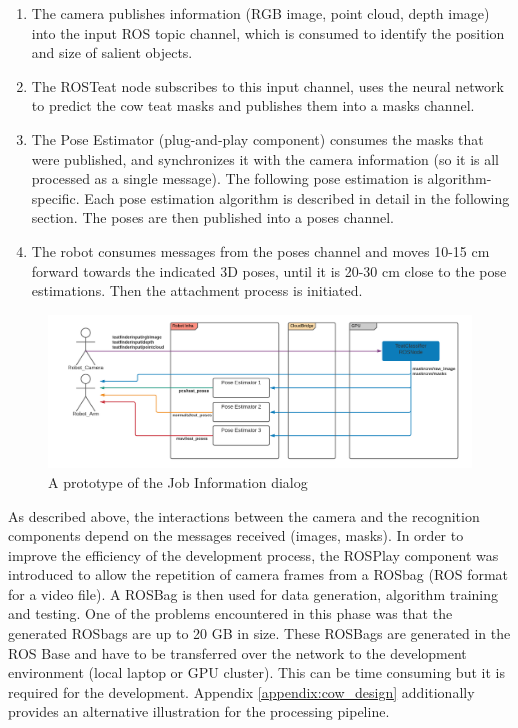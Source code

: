\begin{enumerate}
    \item The camera publishes information (RGB image, point cloud, depth image) into the input ROS topic channel, which is consumed to identify the position and size of salient objects.
    \item The ROSTeat node subscribes to this input channel, uses the neural network to predict the cow teat masks and publishes them into a masks channel.
    \item The Pose Estimator (plug-and-play component) consumes the masks that were published, and synchronizes it with the camera information (so it is all processed as a single message). The following pose estimation is algorithm-specific. Each pose estimation algorithm is described in detail in the following section. The poses are then published into a poses channel.
    \item The robot consumes messages from the poses channel and moves 10-15 cm forward towards the indicated 3D poses, until it is 20-30 cm close to the pose estimations. Then the attachment process is initiated.
\end{enumerate}

\begin{figure}[!ht]
    \centering
    \includegraphics[width=1\textwidth]{images/cow_topics.png}
    \caption{A prototype of the Job Information dialog}
    \label{fig:cow_topics}
\end{figure}



As described above, the interactions between the camera and the recognition components depend on the messages received (images, masks). In order to improve the efficiency of the development process, the ROSPlay component was introduced to allow the repetition of camera frames from a ROSbag (ROS format for a video file). A ROSBag is then used for data generation, algorithm training and testing. One of the problems encountered in this phase was that the generated ROSbags are up to 20 GB in size. These ROSBags are generated in the ROS Base and have to be transferred over the network to the development environment (local laptop or GPU cluster). This can be time consuming but it is required for the development.  
Appendix \ref{appendix:cow_design} additionally provides an alternative illustration for the processing pipeline.